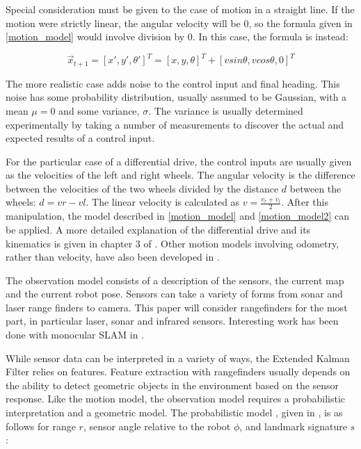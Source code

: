 \documentclass[12pt]{article}
\begin{document}
Special consideration must be given to the case of motion in a straight line.  If the motion were strictly linear, the angular velocity will be 0, so the formula given in \ref{motion_model} would involve division by 0.  In this case, the formula is instead:

\begin{equation}\label{motion_model2}
\vec{x}_{t+1}=[x', y', \theta']^T=[x, y, \theta]^T + [v sin\theta , v cos\theta, 0]^T 
\end{equation}

The more realistic case adds noise to the control input and final heading.  This noise has some probability distribution, usually assumed to be Gaussian, with a mean $\mu=0$ and some variance, $\sigma$.  The variance is usually determined experimentally by taking a number of measurements to discover the actual and expected results of a control input.

For the particular case of a differential drive, the control inputs are usually given as the velocities of the left and right wheels.  The angular velocity is the difference between the velocities of the two wheels divided by the distance $d$ between the wheels:  $d=vr-vl$.  The linear velocity is calculated as $v=\frac{v_r+v_l}{2}$.  After this manipulation, the model described in \ref{motion_model} and \ref{motion_model2} can be applied.  A more detailed explanation of the differential drive and its kinematics is given in chapter 3 of \cite{Dudek}.  Other motion models involving odometry, rather than velocity, have also been developed in \cite{ThrunPR2005}.

The observation model consists of a description of the sensors, the current map and the current robot pose.  Sensors can take a variety of forms from sonar and laser range finders to camera.  This paper will consider rangefinders for the most part, in particular laser, sonar and infrared sensors.  Interesting work has been done with monocular SLAM in \cite{MonoSLAM}.  

While sensor data can be interpreted in a variety of ways, the Extended Kalman Filter relies on features.  Feature extraction with rangefinders usually depends on the ability to detect geometric objects in the environment based on the sensor response.  Like the motion model, the observation model requires a probabilistic interpretation and a geometric model.  The probabilistic model , given in \cite{ThrunPR2005}, is as follows for range $r$, sensor angle relative to the robot $\phi$, and landmark signature $s$:
\end{document}
